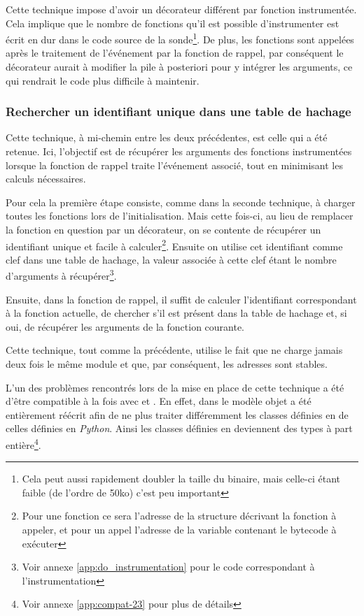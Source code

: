 Cette technique impose d'avoir un décorateur différent par fonction instrumentée. Cela implique que le nombre de fonctions qu'il est possible d'instrumenter est écrit en dur dans le code source de la sonde\footnote{Cela peut aussi rapidement doubler la taille du binaire, mais celle-ci étant faible (de l'ordre de 50ko) c'est peu important}. De plus, les fonctions sont appelées après le traitement de l'événement par la fonction de rappel, par conséquent le décorateur aurait à modifier la pile à posteriori pour y intégrer les arguments, ce qui rendrait le code plus difficile à maintenir.

\subsubsection*{Rechercher un identifiant unique dans une table de hachage}
Cette technique, à mi-chemin entre les deux précédentes, est celle qui a été retenue. Ici, l'objectif est de récupérer les arguments des fonctions instrumentées lorsque la fonction de rappel traite l'événement associé, tout en minimisant les calculs nécessaires.

Pour cela la première étape consiste, comme dans la seconde technique, à charger toutes les fonctions lors de l’initialisation. Mais cette fois-ci, au lieu de remplacer la fonction en question par un décorateur, on se contente de récupérer un identifiant unique et facile à calculer\footnote{Pour une fonction \C ce sera l'adresse de la structure décrivant la fonction \C à appeler, et pour un appel \Python l'adresse de la variable contenant le bytecode à exécuter}. Ensuite on utilise cet identifiant comme clef dans une table de hachage, la valeur associée à cette clef étant le nombre d'arguments à récupérer\footnote{Voir annexe \vref{app:do_instrumentation} pour le code correspondant à l'instrumentation}.

Ensuite, dans la fonction de rappel, il suffit de calculer l'identifiant correspondant à la fonction actuelle, de chercher s'il est présent dans la table de hachage et, si oui, de récupérer les arguments de la fonction courante.

\begin{note}
Cette technique, tout comme la précédente, utilise le fait que \Python ne charge jamais deux fois le même module et que, par conséquent, les adresses sont stables.
\end{note}

\begin{note}
L'un des problèmes rencontrés lors de la mise en place de cette technique a été d'être compatible à la fois avec  et . En effet, dans  le modèle objet a été entièrement réécrit afin de ne plus traiter différemment les classes définies en \C de celles définies en \emph{Python}. Ainsi les classes définies en \Python deviennent des types à part entière\footnote{Voir annexe \vref{app:compat-23} pour plus de détails}.
\end{note}
\clearpage
